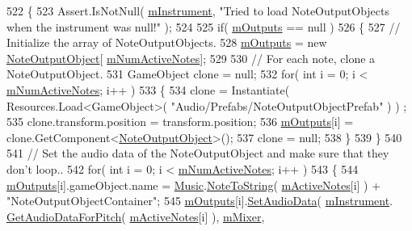 \begin{DoxyCode}
522     \{
523         Assert.IsNotNull( \hyperlink{group___v_i_m_priv_gaed435d1f9be09864846db4322dc21fd1}{mInstrument}, \textcolor{stringliteral}{"Tried to load NoteOutputObjects when the instrument was
       null!"} );
524 
525         \textcolor{keywordflow}{if}( \hyperlink{group___v_i_m_priv_ga53f837fd01475fa35629a650e7fa00e3}{mOutputs} == null )
526         \{
527             \textcolor{comment}{// Initialize the array of NoteOutputObjects.}
528             \hyperlink{group___v_i_m_priv_ga53f837fd01475fa35629a650e7fa00e3}{mOutputs} = \textcolor{keyword}{new} \hyperlink{class_note_output_object}{NoteOutputObject}[
      \hyperlink{group___v_i_m_priv_ga0f7e11945763c48057be326b661dfdaf}{mNumActiveNotes}];
529 
530             \textcolor{comment}{// For each note, clone a NoteOutputObject.}
531             GameObject clone = null;
532             \textcolor{keywordflow}{for}( \textcolor{keywordtype}{int} i = 0; i < \hyperlink{group___v_i_m_priv_ga0f7e11945763c48057be326b661dfdaf}{mNumActiveNotes}; i++ )
533             \{
534                 clone = Instantiate( Resources.Load<GameObject>( \textcolor{stringliteral}{"Audio/Prefabs/NoteOutputObjectPrefab"} ) )
      ;
535                 clone.transform.position = transform.position;
536                 \hyperlink{group___v_i_m_priv_ga53f837fd01475fa35629a650e7fa00e3}{mOutputs}[i] = clone.GetComponent<\hyperlink{class_note_output_object}{NoteOutputObject}>();
537                 clone = null;
538             \}
539         \}
540 
541         \textcolor{comment}{// Set the audio data of the NoteOutputObject and make sure that they don't loop..}
542         \textcolor{keywordflow}{for}( \textcolor{keywordtype}{int} i = 0; i < \hyperlink{group___v_i_m_priv_ga0f7e11945763c48057be326b661dfdaf}{mNumActiveNotes}; i++ )
543         \{
544             \hyperlink{group___v_i_m_priv_ga53f837fd01475fa35629a650e7fa00e3}{mOutputs}[i].gameObject.name = \hyperlink{class_music}{Music}.\hyperlink{group___music_stat_func_ga85a22c905d56d4c5f4e62159bfecee8c}{NoteToString}( 
      \hyperlink{group___v_i_m_priv_ga5cedf9995d59b416412677e6004b659c}{mActiveNotes}[i] ) + \textcolor{stringliteral}{"NoteOutputObjectContainer"};
545             \hyperlink{group___v_i_m_priv_ga53f837fd01475fa35629a650e7fa00e3}{mOutputs}[i].\hyperlink{group___n_o_o_pub_func_gaef9ab691f0a2671a62249d853f24162d}{SetAudioData}( \hyperlink{group___v_i_m_priv_gaed435d1f9be09864846db4322dc21fd1}{mInstrument}.
      \hyperlink{group___v_i_base_pub_func_gaf715f7c3bbd2f1a2fa543b2f0684f8a6}{GetAudioDataForPitch}( \hyperlink{group___v_i_m_priv_ga5cedf9995d59b416412677e6004b659c}{mActiveNotes}[i] ), \hyperlink{group___v_i_m_priv_ga08c8db1bb89f4ab1e28451dd93d6b99c}{mMixer}, 

\end{DoxyCode}
